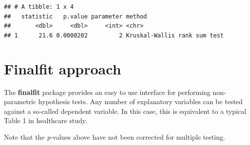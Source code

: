 \documentclass[
  12pt,
  krantz2]{krantz}
\makeatletter
\newenvironment{Shaded}{\begin{snugshade}}{\end{snugshade}}
\newcommand{\DataTypeTok}[1]{\textcolor[rgb]{0.13,0.29,0.53}{#1}}
\newcommand{\KeywordTok}[1]{\textcolor[rgb]{0.13,0.29,0.53}{\textbf{#1}}}
\newcommand{\NormalTok}[1]{#1}
\newcommand{\OperatorTok}[1]{\textcolor[rgb]{0.81,0.36,0.00}{\textbf{#1}}}
\newcommand{\OtherTok}[1]{\textcolor[rgb]{0.56,0.35,0.01}{#1}}
\newcommand{\StringTok}[1]{\textcolor[rgb]{0.31,0.60,0.02}{#1}}
\newenvironment{kframe}{%
\medskip{}
\setlength{\fboxsep}{.8em}
 \def\at@end@of@kframe{}%
 \ifinner\ifhmode%
  \def\at@end@of@kframe{\end{minipage}}%
  \begin{minipage}{\columnwidth}%
 \fi\fi%
 \def\FrameCommand##1{\hskip\@totalleftmargin \hskip-\fboxsep
 \colorbox{shadecolor}{##1}\hskip-\fboxsep
     \hskip-\linewidth \hskip-\@totalleftmargin \hskip\columnwidth}%
 \MakeFramed {\advance\hsize-\width
   \@totalleftmargin\z@ \linewidth\hsize
   \@setminipage}}%
 {\par\unskip\endMakeFramed%
 \at@end@of@kframe}
\renewenvironment{Shaded}{\begin{kframe}}{\end{kframe}}
\makeatother
\begin{document}
\begin{verbatim}
## # A tibble: 1 x 4
##   statistic   p.value parameter method                      
##       <dbl>     <dbl>     <int> <chr>                       
## 1      21.6 0.0000202         2 Kruskal-Wallis rank sum test
\end{verbatim}


\hypertarget{finalfit-approach}{%
\section{Finalfit approach}\label{finalfit-approach}}

The \textbf{finalfit} package provides an easy to use interface for performing non-parametric hypothesis tests.
Any number of explanatory variables can be tested against a so-called dependent variable.
In this case, this is equivalent to a typical Table 1 in healthcare study.

\begin{Shaded}
\end{Shaded}

Note that the \emph{p}-values above have not been corrected for multiple testing.

\begin{table}[!h]

\caption{\label{tab:unnamed-chunk-27}Life expectancy, population and GDPperCap in Africa 1982 vs 2007.}
\centering
{}
\end{table}
\end{document}
